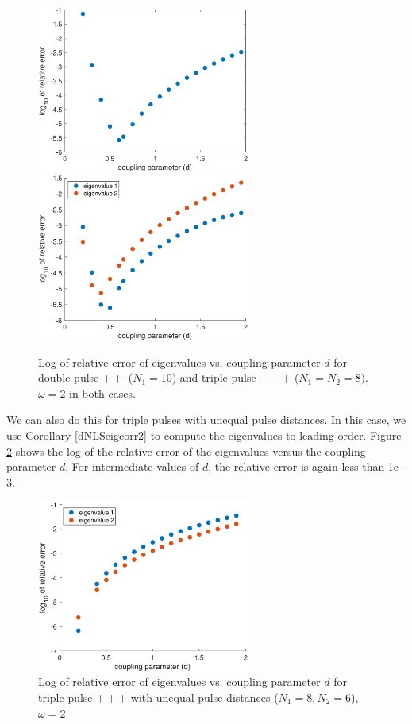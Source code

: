 \documentclass[12pt]{article}
\begin{document}
\begin{figure}[H]
\centering
\includegraphics[width=7cm]{errors1.eps}
\includegraphics[width=7cm]{errors2.eps}
\caption{Log of relative error of eigenvalues vs. coupling parameter $d$ for double pulse $++$ ($N_1 = 10$) and triple pulse $+-+$ ($N_1 = N_2 = 8)$. $\omega = 2$ in both cases.}
\label{fig:error1}
\end{figure}

We can also do this for triple pulses with unequal pulse distances. In this case, we use Corollary \ref{dNLSeigcorr2} to compute the eigenvalues to leading order. Figure \ref{fig:error2} shows the log of the relative error of the eigenvalues versus the coupling parameter $d$.
For intermediate values of $d$, the relative error is again less than 1e-3.

\begin{figure}[H]
\centering
\includegraphics[width=7cm]{errors3.eps}
\caption{Log of relative error of eigenvalues vs. coupling parameter $d$ for triple pulse $+++$ with unequal pulse distances ($N_1 = 8, N_2 = 6$), $\omega = 2$.}
\label{fig:error2}
\end{figure}
\end{document}
